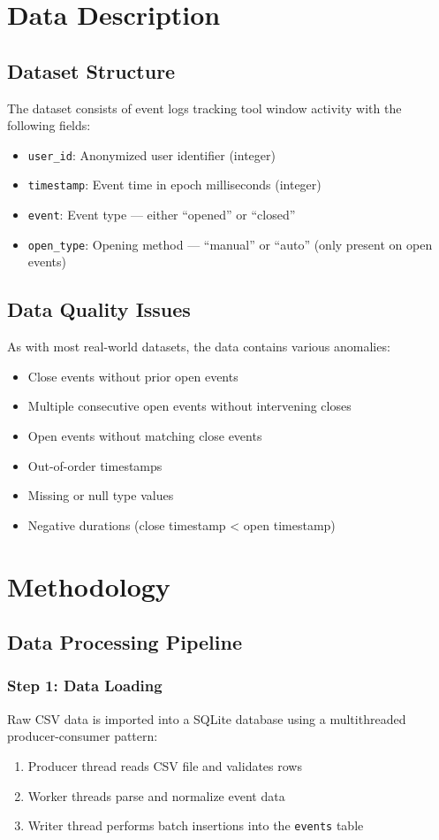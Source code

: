 \documentclass[12pt,a4paper]{article}
\begin{document}
\section{Data Description}

\subsection{Dataset Structure}
The dataset consists of event logs tracking tool window activity with the following fields:
\begin{itemize}
    \item \texttt{user\_id}: Anonymized user identifier (integer)
    \item \texttt{timestamp}: Event time in epoch milliseconds (integer)
    \item \texttt{event}: Event type — either ``opened'' or ``closed''
    \item \texttt{open\_type}: Opening method — ``manual'' or ``auto'' (only present on open events)
\end{itemize}

\subsection{Data Quality Issues}
As with most real-world datasets, the data contains various anomalies:
\begin{itemize}
    \item Close events without prior open events
    \item Multiple consecutive open events without intervening closes
    \item Open events without matching close events
    \item Out-of-order timestamps
    \item Missing or null type values
    \item Negative durations (close timestamp < open timestamp)
\end{itemize}

\section{Methodology}

\subsection{Data Processing Pipeline}

\subsubsection{Step 1: Data Loading}
Raw CSV data is imported into a SQLite database using a multithreaded producer-consumer pattern:
\begin{enumerate}
    \item Producer thread reads CSV file and validates rows
    \item Worker threads parse and normalize event data
    \item Writer thread performs batch insertions into the \texttt{events} table
\end{enumerate}
\end{document}
